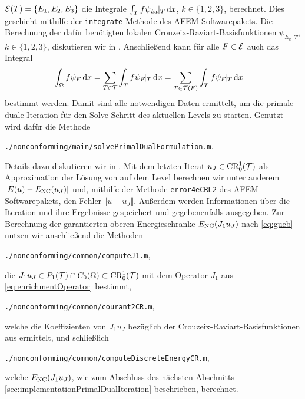 $\mathcal{E}(T)=\{E_1,E_2,E_3\}$ die Integrale $\int_T f\psi_{E_k}\!|_T\,\mathrm{d}x$,
$k\in\{1,2,3\}$, berechnet. 
Dies geschieht mithilfe der \texttt{integrate} Methode \cite[Abschnitt
1.8.2]{CGKNRR10} des AFEM-Softwarepakets.
Die Berechnung der dafür benötigten lokalen Crouzeix-Raviart-Basisfunktionen
$\psi_{E_k}\!|_T$, $k\in\{1,2,3\}$, diskutieren wir in
.
Anschließend kann für alle $F\in\mathcal{E}$ auch das Integral 
\begin{align*}
  \int_\Omega f\psi_F\,\mathrm{d}x
  &=
  \sum_{T\in\mathcal{T}}\int_T f\psi_F\!|_T\,\mathrm{d}x
  =
  \sum_{T\in\mathcal{T}(F)}\int_T f\psi_F\!|_T\,\mathrm{d}x
\end{align*}
bestimmt werden.
Damit sind alle notwendigen Daten ermittelt, um die primale-duale Iteration für
den Solve-Schritt des aktuellen Levels zu starten. 
Genutzt wird dafür die Methode
\begin{center}
  \texttt{./nonconforming/main/solvePrimalDualFormulation.m}.
\end{center}
Details dazu diskutieren wir in .
Mit dem letzten Iterat $u_J\in\textup{CR}^1_0(\mathcal{T})$ als Approximation der Lösung von
 auf dem Level berechnen wir unter anderem
$|E(u)-E_\textup{NC}(u_J)|$ und, mithilfe der Methode \texttt{error4eCRL2}
\cite[Abschnitt 1.8.3]{CGKNRR10} des AFEM-Soft\-ware\-pakets, den Fehler $\Vert
u - u_J\Vert$.
Außerdem werden Informationen über die Iteration und ihre Ergebnisse
gespeichert und gegebenenfalls ausgegeben. 
Zur Berechnung der garantierten oberen Energieschranke $E_\textup{NC}(J_1 u_J)$ nach
\eqref{eq:gueb} nutzen wir anschließend die Methoden
\begin{center}
    \texttt{./nonconforming/common/computeJ1.m},
\end{center}
die $J_1 u_J\in P_1(\mathcal{T})\cap C_0(\Omega)\subset \textup{CR}^1_0(\mathcal{T})$ mit dem
Operator $J_1$ aus \eqref{eq:enrichmentOperator} bestimmt,
\begin{center}
    \texttt{./nonconforming/common/courant2CR.m},
\end{center}
welche die Koeffizienten von $J_1 u_J$ bezüglich der
Crouzeix-Raviart-Basisfunktionen aus  
ermittelt, und schließlich
\begin{center}
    \texttt{./nonconforming/common/computeDiscreteEnergyCR.m},
\end{center}
welche $E_\textup{NC}(J_1 u_J)$, wie zum Abschluss des nächsten Abschnitts
\ref{sec:implementationPrimalDualIteration} beschrieben, berechnet.
